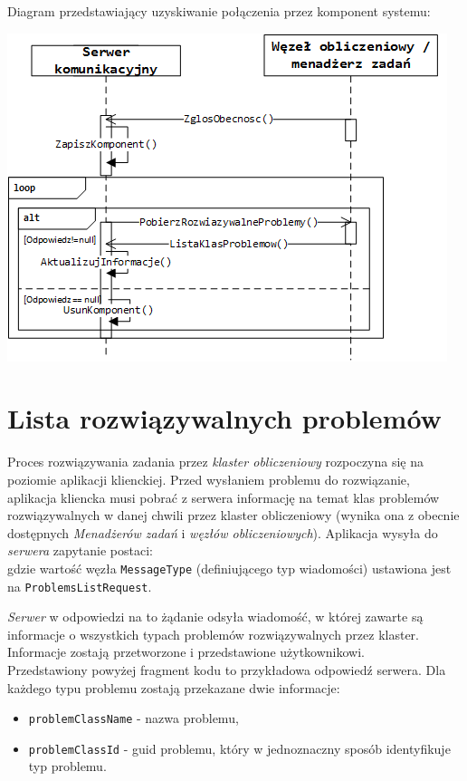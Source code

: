 \documentclass[12pt,a4paper,titlepage]{report}
\begin{document}
	 

	Diagram przedstawiający uzyskiwanie połączenia przez komponent systemu:
	
		\includegraphics[width=\textwidth]{img/communication/connecting.png}	
	
	\section{Lista rozwiązywalnych problemów}
	Proces rozwiązywania zadania przez \textit{klaster obliczeniowy} rozpoczyna się na poziomie aplikacji klienckiej. Przed
	wysłaniem problemu do rozwiązanie, aplikacja kliencka musi pobrać z serwera informację na temat klas problemów
	rozwiązywalnych w danej chwili przez klaster obliczeniowy (wynika ona z obecnie dostępnych \textit{Menadżerów zadań} i \textit{węzłów obliczeniowych}). Aplikacja wysyła do \textit{serwera} zapytanie postaci: \\
	
	 
	gdzie wartość węzła \verb+MessageType+ (definiującego typ wiadomości) ustawiona jest na \verb+ProblemsListRequest+.  	

	
    \textit{Serwer} w odpowiedzi na to żądanie odsyła wiadomość, w której zawarte są informacje o wszystkich typach problemów rozwiązywalnych przez klaster. Informacje zostają przetworzone i przedstawione użytkownikowi.\\
	
	Przedstawiony powyżej fragment kodu to przykładowa odpowiedź serwera. Dla każdego typu problemu zostają przekazane dwie informacje:
	\begin{itemize}
	\item \verb+problemClassName+ - nazwa problemu,
	\item \verb+problemClassId+ - guid problemu, który w jednoznaczny sposób identyfikuje typ problemu.
	
	\end{itemize}   
	
\end{document}
